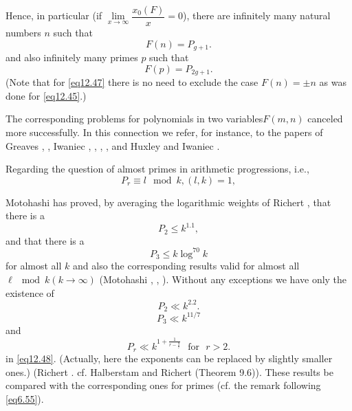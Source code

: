 Hence, in particular (if $\lim\limits_{x \to
  \infty}\dfrac{x_0(F)}{x}=0$), there are infinitely many natural
numbers $n$ such that 
\begin{equation*}
F(n)=P_{g+1}. \tag{12.46}\label{eq12.46}
\end{equation*}
and also infinitely many primes $p$ such that
\begin{equation*}
F(p)=P_{2g+1}. \tag{12.47}\label{eq12.47}
\end{equation*}
(Note that for \eqref{eq12.47} there is no need to exclude the case
$F(n)=\pm n$ as was done for \eqref{eq12.45}.) 

The corresponding problems for polynomials in two variables\break $F(m, n)$
canceled more successfully. In this connection we refer, for
instance, to the papers of Greaves \cite{key1}, \cite{key2}, Iwaniec
\cite{key2}, \cite{key3}, \cite{key5}, \cite{key6}, and Huxley and
Iwaniec \cite{key1}.  

Regarding the question of almost primes in arithmetic progressions, i.e.,
\begin{equation*}
P_r \equiv l \mod k, (l,k)=1, \tag{12.48}\label{eq12.48}
\end{equation*}\pageoriginale

Motohashi has proved, by averaging the logarithmic weights of Ric\-hert
\cite{key1}, that there is a 
\begin{equation*}
P_2 \leq k^{1.1}, \tag{12.49}\label{eq12.49}
\end{equation*}
and that there is a
\begin{equation*}
P_3 \leq k \log^{70} k \tag{12.50}\label{eq12.50}
\end{equation*}
for almost all $k$ and also the corresponding results valid for almost
all $\ell \mod k (k \to \infty)$ (Motohashi \cite{key12},
\cite{key13}, \cite{key15}). Without
any exceptions we have only the existence of 
\begin{equation*}
P_2 \ll k^{2.2}. \tag{12.51}\label{eq12.51}
 \end{equation*}
 \begin{equation*}
P_3 \ll k^{11/7} \tag{12.52}\label{eq12.52}
\end{equation*}  
and
\begin{equation*}
P_r \ll k^{1+\frac{1}{r-\frac{9}{7}}} \text{~ for~ } r>
2. \tag{12.53}\label{eq12.53} 
\end{equation*}
in \eqref{eq12.48}. (Actually, here the exponents can be replaced by
slightly smaller ones.) (Richert \cite{key1}. cf. Halberstam and
Richert \cite{key1} (Theorem 9.6)). These results be compared with the
corresponding ones for primes (cf. the remark following
\eqref{eq6.55}). 

